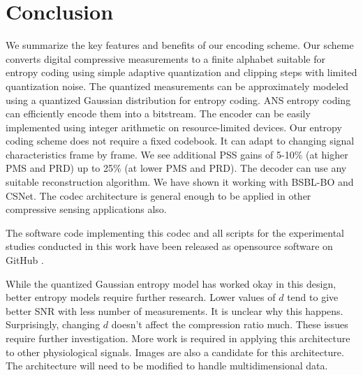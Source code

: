 \section{Conclusion}
\label{sec:conclusion}

We summarize the key features and benefits of our encoding scheme.
Our scheme converts digital compressive measurements
to a finite alphabet suitable for entropy coding using
simple adaptive quantization and clipping steps with limited quantization noise.
The quantized measurements can be approximately modeled using a quantized
Gaussian distribution for entropy coding.
ANS entropy coding can efficiently encode them into a
bitstream.
The encoder can be easily implemented using integer arithmetic
on resource-limited devices.
Our entropy coding scheme does not require a fixed codebook.
It can adapt to changing signal characteristics frame by frame. 
We see additional PSS gains of 5-10\% (at higher PMS and PRD)
up to 25\% (at lower PMS and PRD).
The decoder can use any suitable reconstruction algorithm.
We have shown it working with BSBL-BO and CSNet.  
The codec architecture is general enough to be applied
in other compressive sensing applications also.

The software code implementing this codec
and all scripts for the experimental studies conducted
in this work have been released as opensource software
on GitHub \cite{kumar2022ecgcodec}.

While the quantized Gaussian entropy model has worked okay in this
design, better entropy models require further research.
Lower values of $d$ tend to give better SNR with less number
of measurements. It is unclear why this happens. Surprisingly,
changing $d$ doesn't affect the compression ratio much.
These issues require further investigation.
More work is required in applying this architecture to other
physiological signals. Images are also a candidate for this
architecture. The architecture will need to be modified
to handle multidimensional data. 
